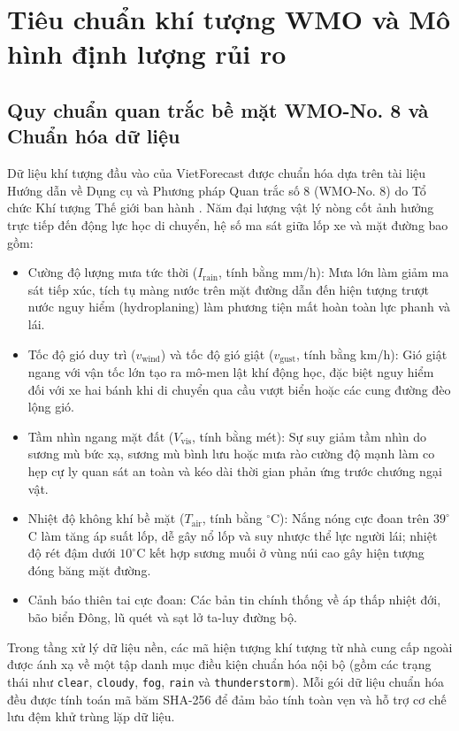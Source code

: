 \section{Tiêu chuẩn khí tượng WMO và Mô hình định lượng rủi ro}

\subsection{Quy chuẩn quan trắc bề mặt WMO-No. 8 và Chuẩn hóa dữ liệu}

Dữ liệu khí tượng đầu vào của VietForecast được chuẩn hóa dựa trên tài liệu Hướng dẫn về Dụng cụ và Phương pháp Quan trắc số 8 (WMO-No. 8) do Tổ chức Khí tượng Thế giới ban hành \cite{wmo2021guidelines}. Năm đại lượng vật lý nòng cốt ảnh hưởng trực tiếp đến động lực học di chuyển, hệ số ma sát giữa lốp xe và mặt đường bao gồm:
\begin{itemize}
    \item[-] Cường độ lượng mưa tức thời ($I_{\text{rain}}$, tính bằng mm/h): Mưa lớn làm giảm ma sát tiếp xúc, tích tụ màng nước trên mặt đường dẫn đến hiện tượng trượt nước nguy hiểm (hydroplaning) làm phương tiện mất hoàn toàn lực phanh và lái.
    \item[-] Tốc độ gió duy trì ($v_{\text{wind}}$) và tốc độ gió giật ($v_{\text{gust}}$, tính bằng km/h): Gió giật ngang với vận tốc lớn tạo ra mô-men lật khí động học, đặc biệt nguy hiểm đối với xe hai bánh khi di chuyển qua cầu vượt biển hoặc các cung đường đèo lộng gió.
    \item[-] Tầm nhìn ngang mặt đất ($V_{\text{vis}}$, tính bằng mét): Sự suy giảm tầm nhìn do sương mù bức xạ, sương mù bình lưu hoặc mưa rào cường độ mạnh làm co hẹp cự ly quan sát an toàn và kéo dài thời gian phản ứng trước chướng ngại vật.
    \item[-] Nhiệt độ không khí bề mặt ($T_{\text{air}}$, tính bằng $^\circ$C): Nắng nóng cực đoan trên $39^\circ$C làm tăng áp suất lốp, dễ gây nổ lốp và suy nhược thể lực người lái; nhiệt độ rét đậm dưới $10^\circ$C kết hợp sương muối ở vùng núi cao gây hiện tượng đóng băng mặt đường.
    \item[-] Cảnh báo thiên tai cực đoan: Các bản tin chính thống về áp thấp nhiệt đới, bão biển Đông, lũ quét và sạt lở ta-luy đường bộ.
\end{itemize}

Trong tầng xử lý dữ liệu nền, các mã hiện tượng khí tượng từ nhà cung cấp ngoài được ánh xạ về một tập danh mục điều kiện chuẩn hóa nội bộ (gồm các trạng thái như \texttt{clear}, \texttt{cloudy}, \texttt{fog}, \texttt{rain} và \texttt{thunderstorm}). Mỗi gói dữ liệu chuẩn hóa đều được tính toán mã băm SHA-256 để đảm bảo tính toàn vẹn và hỗ trợ cơ chế lưu đệm khử trùng lặp dữ liệu.

